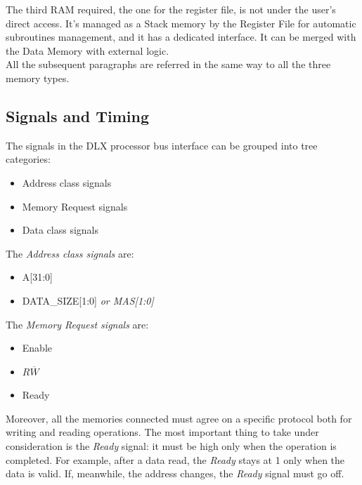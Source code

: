 The third RAM required, the one for the register file, is not under the user's direct access. It's managed as a Stack memory by the Register File for automatic subroutines management, and it has a dedicated interface. It can be merged with the Data Memory with external logic.\\

All the subsequent paragraphs are referred in the same way to all the three memory types.

\subsection{Signals and Timing}
The signals in the DLX processor bus interface can be grouped into tree categories:
\begin{itemize}
    \itemsep0sp
    \item Address class signals
    \item Memory Request signals
    \item Data class signals
\end{itemize}

The \emph{Address class signals} are:
\begin{itemize}
    \itemsep0sp
    \item A{[31:0]}
    \item DATA\_SIZE{[1:0]} \emph{or MAS{[1:0]}}
\end{itemize}

The \emph{Memory Request signals} are:
\begin{itemize}
    \itemsep0sp
    \item Enable
    \item $R\overline{W}$
    \item Ready
\end{itemize}

Moreover, all the memories connected must agree on a specific protocol both for writing and reading operations. The most important thing to take under consideration is the \emph{Ready} signal: it must be high only when the operation is completed. For example, after a data read, the \emph{Ready} stays at 1 only when the data is valid. If, meanwhile, the address changes, the \emph{Ready} signal must go off.

